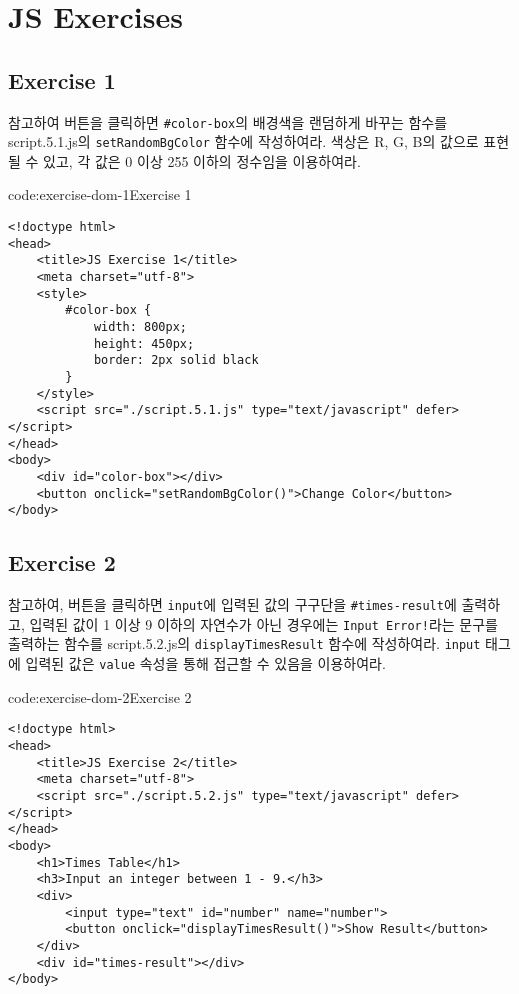 \section{JS Exercises} \label{sect:js-exercises}

\subsection*{Exercise 1}

\을 참고하여 버튼을 클릭하면 \texttt{\#color-box}의 배경색을 랜덤하게 바꾸는 함수를 script.5.1.js의 \texttt{setRandomBgColor} 함수에 작성하여라. 색상은 R, G, B의 값으로 표현될 수 있고, 각 값은 0 이상 255 이하의 정수임을 이용하여라.

\begin{codeenv}{code:exercise-dom-1}{Exercise 1}\begin{verbatim}
<!doctype html>
<head>
    <title>JS Exercise 1</title>
    <meta charset="utf-8">
    <style>
        #color-box {
            width: 800px;
            height: 450px;
            border: 2px solid black
        }
    </style>
    <script src="./script.5.1.js" type="text/javascript" defer></script>
</head>
<body>
    <div id="color-box"></div>
    <button onclick="setRandomBgColor()">Change Color</button>
</body>
\end{verbatim}
\end{codeenv}

\subsection*{Exercise 2}

\를 참고하여, 버튼을 클릭하면 \texttt{input}에 입력된 값의 구구단을 \texttt{\#times-result}에 출력하고, 입력된 값이 1 이상 9 이하의 자연수가 아닌 경우에는 \texttt{Input Error!}라는 문구를 출력하는 함수를 script.5.2.js의 \texttt{displayTimesResult} 함수에 작성하여라. \texttt{input} 태그에 입력된 값은 \texttt{value} 속성을 통해 접근할 수 있음을 이용하여라.

\begin{codeenv}{code:exercise-dom-2}{Exercise 2}\begin{verbatim}
<!doctype html>
<head>
    <title>JS Exercise 2</title>
    <meta charset="utf-8">
    <script src="./script.5.2.js" type="text/javascript" defer></script>
</head>
<body>
    <h1>Times Table</h1>
    <h3>Input an integer between 1 - 9.</h3>
    <div>
        <input type="text" id="number" name="number">
        <button onclick="displayTimesResult()">Show Result</button>
    </div>
    <div id="times-result"></div>
</body>
\end{verbatim}
\end{codeenv}

